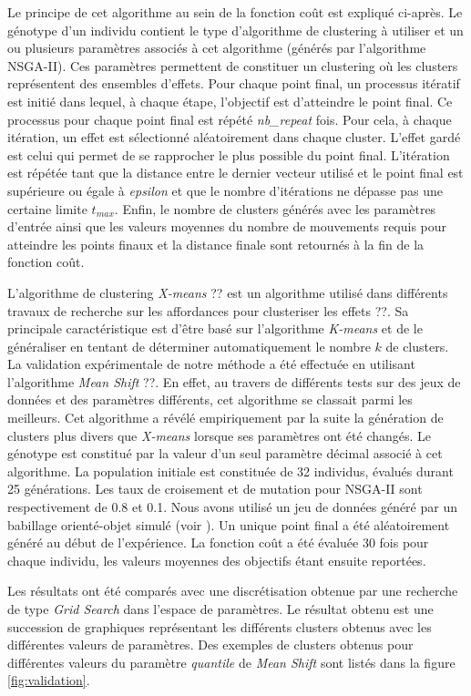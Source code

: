 \documentclass[draft]{llncs}
\begin{document}
Le principe de cet algorithme au sein de la fonction coût est expliqué ci-après. 
Le génotype d'un individu contient le type d'algorithme de clustering à utiliser et un ou plusieurs paramètres associés à cet algorithme (générés par l'algorithme NSGA-II).
Ces paramètres permettent de constituer un clustering où les clusters représentent des ensembles d'effets.
Pour chaque point final, un processus itératif est initié dans lequel, à chaque étape, l'objectif est d'atteindre le point final.
Ce processus pour chaque point final est répété \textit{nb\_repeat} fois.
Pour cela, à chaque itération, un effet est sélectionné aléatoirement dans chaque cluster.
L'effet gardé est celui qui permet de se rapprocher le plus possible du point final.
L'itération est répétée tant que la distance entre le dernier vecteur utilisé et le point final est supérieure ou égale à \textit{epsilon} et que le nombre d'itérations ne dépasse pas une certaine limite $t_{max}$.
Enfin, le nombre de clusters générés avec les paramètres d'entrée ainsi que les valeurs moyennes du nombre de mouvements requis pour atteindre les points finaux et la distance finale sont retournés à la fin de la fonction coût.

L'algorithme de clustering \textit{X-means} ?? est un algorithme utilisé dans différents travaux de recherche sur les affordances pour clusteriser les effets ??.
Sa principale caractéristique est d'être basé sur l'algorithme \textit{K-means} et de le généraliser en tentant de déterminer automatiquement le nombre $k$ de clusters.
La validation expérimentale de notre méthode a été effectuée en utilisant l'algorithme \textit{Mean Shift} ??.
En effet, au travers de différents tests sur des jeux de données et des paramètres différents, cet algorithme se classait parmi les meilleurs.
Cet algorithme a révélé empiriquement par la suite la génération de clusters plus divers que \mbox{\textit{X-means}} lorsque ses paramètres ont été changés.
Le génotype est constitué par la valeur d'un seul paramètre décimal associé à cet algorithme.
La population initiale est constituée de 32 individus, évalués durant 25 générations. Les taux de croisement et de mutation pour NSGA-II sont respectivement de 0.8 et 0.1. Nous avons utilisé un jeu de données généré par un babillage orienté-objet simulé (voir ).
Un unique point final a été aléatoirement généré au début de l'expérience. La fonction coût a été évaluée 30 fois pour chaque individu, les valeurs moyennes des objectifs étant ensuite reportées.

Les résultats ont été comparés avec une discrétisation obtenue par une recherche de type \textit{Grid Search} dans l'espace de paramètres.
Le résultat obtenu est une succession de graphiques représentant les différents clusters obtenus avec les différentes valeurs de paramètres.
Des exemples de clusters obtenus pour différentes valeurs du paramètre \textit{quantile} de \textit{Mean Shift} sont listés dans la figure \ref{fig:validation}.
\end{document}
